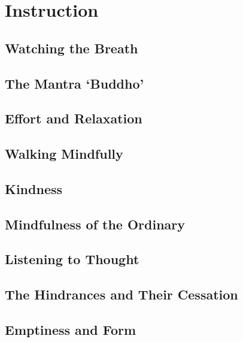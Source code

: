 \documentclass[11pt,twoside,final]{memoir}
\begin{document}
\part{Instruction}

\chapter{Watching the Breath}


\chapter{The Mantra `Buddho'}


\chapter{Effort and Relaxation}


\chapter{Walking Mindfully}


\chapter{Kindness}


\chapter{Mindfulness of the Ordinary}


\chapter{Listening to Thought}


\chapter{The Hindrances and Their Cessation}


\chapter{Emptiness and Form}

\end{document}
